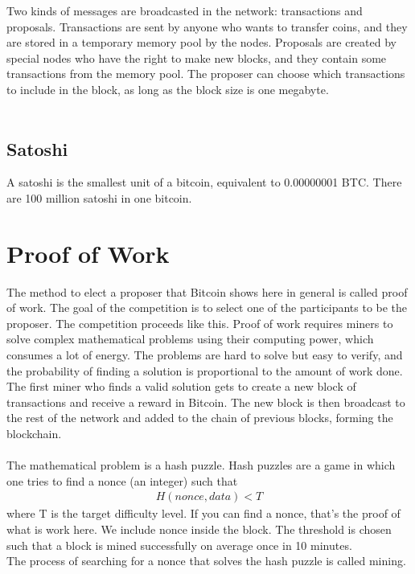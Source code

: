 Two kinds of messages are broadcasted in the network: transactions and proposals. Transactions are sent by anyone who wants to transfer coins, and they are stored in a temporary memory pool by the nodes. Proposals are created by special nodes who have the right to make new blocks, and they contain some transactions from the memory pool. The proposer can choose which transactions to include in the block, as long as the block size is one megabyte.\\\\
\subsection{Satoshi}
A satoshi is the smallest unit of a bitcoin, equivalent to 0.00000001 BTC. There are 100 million satoshi in one bitcoin.
\section{Proof of Work}
The method to elect a proposer that Bitcoin shows here in general is called proof of work. The goal of the competition is to select one of the participants to be the proposer. The competition proceeds like this.  Proof of work requires miners to solve complex mathematical problems using their computing power, which consumes a lot of energy. The problems are hard to solve but easy to verify, and the probability of finding a solution is proportional to the amount of work done. The first miner who finds a valid solution gets to create a new block of transactions and receive a reward in Bitcoin. The new block is then broadcast to the rest of the network and added to the chain of previous blocks, forming the blockchain.\\\\
The mathematical problem is a hash puzzle. Hash puzzles are a game in which one tries to find a nonce (an integer) such that 
\begin{align*}
    H(nonce, data) < T
\end{align*}
where T is the target difficulty level. If you can find a nonce, that's the proof of what is work here. We include nonce inside the block. The threshold is chosen such that a block is mined successfully on average once in 10 minutes.\\
The process of searching for a nonce that solves the hash puzzle is called mining.
